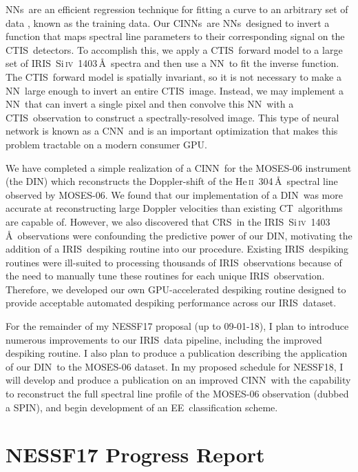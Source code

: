 \documentclass[10pt,letterpaper, doublespace]{article}
\newcommand{\SiIV}{Si\,\textsc{iv}~1403\,\AA}
\newcommand{\HeII}{He\,\textsc{ii}~304\,\AA}
\newcommand{\EE}{\ac{EE}}
\newcommand{\CT}{\ac{CT}}
\newcommand{\CTIS}{\ac{CTIS}}
\newcommand{\MOSES}{\ac{MOSES}}
\newcommand{\NN}{\ac{NN}}
\newcommand{\NNs}{\acp{NN}}
\newcommand{\CNN}{\ac{CNN}}
\newcommand{\CINN}{\ac{CINN}}
\newcommand{\CINNs}{\acp{CINN}}
\newcommand{\DIN}{\ac{DIN}}
\newcommand{\SPIN}{\ac{SPIN}}
\newcommand{\IRIS}{\ac{IRIS}}
\newcommand{\CRS}{\ac{CRS}}
\newcommand{\GPU}{\ac{GPU}}
\begin{document}
		\NNs\ are an efficient regression technique for fitting a curve to an arbitrary set of data \citep{ai}, known as the training data.
		Our \CINNs\ are \NNs\ designed to invert a function that maps spectral line parameters to their corresponding signal on the \CTIS\ detectors.
		To accomplish this, we apply a \CTIS\ forward model to a large set of \IRIS\ \SiIV\ spectra and then use a \NN\ to fit the inverse function.
		The \CTIS\ forward model is spatially invariant, so it is not necessary to make a \NN\ large enough to invert an entire \CTIS\ image.
		Instead, we may implement a \NN\ that can invert a single pixel and then convolve this \NN\ with a \CTIS\ observation to construct a spectrally-resolved image.
		This type of neural network is known as a \CNN\ and is an important optimization that makes this problem tractable on a modern consumer \GPU.
			
		We have completed a simple realization of a \CINN\ for the \MOSES-06 instrument (the \DIN) which reconstructs the Doppler-shift of the \HeII\ spectral line observed by \MOSES-06.
		We found that our implementation of a \DIN\ was more accurate at reconstructing large Doppler velocities than existing \CT\ algorithms are capable of.
		However, we also discovered that \CRS\ in the \IRIS\ \SiIV\ observations were confounding the predictive power of our \DIN, motivating the addition of a \IRIS\ despiking routine into our procedure.
		Existing \IRIS\ despiking routines were ill-suited to processing thousands of \IRIS\ observations because of the need to manually tune these routines for each unique \IRIS\ observation.
		Therefore, we developed our own GPU-accelerated despiking routine designed to provide acceptable automated despiking performance across our \IRIS\ dataset.
		
		For the remainder of my NESSF17 proposal (up to 09-01-18), I plan to introduce numerous improvements to our \IRIS\ data pipeline, including the improved despiking routine. I also plan to produce a publication describing the application of our \DIN\ to the \MOSES-06 dataset.
		In my proposed schedule for NESSF18, I will develop and produce a publication on an improved \CINN\ with the capability to reconstruct the full spectral line profile of the \MOSES-06 observation (dubbed a \SPIN), and begin development of an \EE\ classification scheme.		
	
	\section{NESSF17 Progress Report} 
	
\end{document}
